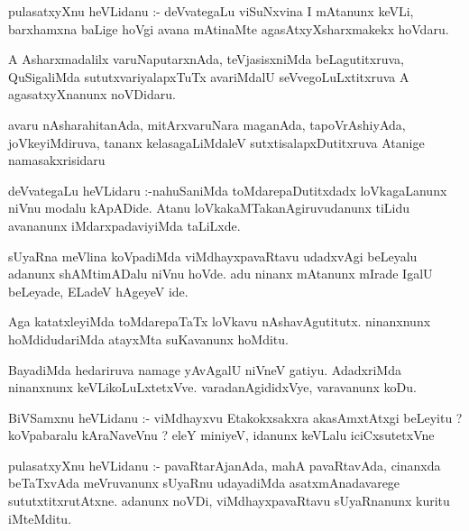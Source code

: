 \documentclass{article}
\begin{document}
\begin{mn}
pulasatxyXnu  heVLidanu :- deVvategaLu  viSuNxvina  I  mAtanunx  keVLi,  barxhamxna  
baLige  hoVgi  avana  mAtinaMte  agasAtxyXsharxmakekx  hoVdaru.
\end{mn}

\begin{mn}
A Asharxmadalilx  varuNaputarxnAda,  teVjasisxniMda  beLagutitxruva,  QuSigaliMda  
sututxvariyalapxTuTx  avariMdalU  seVvegoLuLxtitxruva  A  agasatxyXnanunx  noVDidaru.
\end{mn}

\begin{mn}
avaru  nAsharahitanAda,  mitArxvaruNara  maganAda,  tapoVrAshiyAda,  joVkeyiMdiruva,  
tananx  kelasagaLiMdaleV  sutxtisalapxDutitxruva  Atanige  namasakxrisidaru
\end{mn}

\begin{mn}
deVvategaLu  heVLidaru :-nahuSaniMda  toMdarepaDutitxdadx  loVkagaLanunx  niVnu  modalu  
kApADide.  Atanu  loVkakaMTakanAgiruvudanunx  tiLidu  avananunx  iMdarxpadaviyiMda  taLiLxde.
\end{mn}

\begin{mn}
sUyaRna  meVlina  koVpadiMda  viMdhayxpavaRtavu  udadxvAgi  beLeyalu  adanunx  shAMtimADalu  
niVnu  hoVde.  adu  ninanx  mAtanunx  mIrade  IgalU  beLeyade,  ELadeV  hAgeyeV  ide.
\end{mn}

\begin{mn}
Aga  katatxleyiMda  toMdarepaTaTx  loVkavu  nAshavAgutitutx.  ninanxnunx  hoMdidudariMda  
atayxMta  suKavanunx  hoMditu.
\end{mn}

\begin{mn}
BayadiMda  hedariruva  namage  yAvAgalU  niVneV  gatiyu.  AdadxriMda  ninanxnunx  
keVLikoLuLxtetxVve.  varadanAgididxVye,  varavanunx  koDu.
\end{mn}

\begin{mn}
BiVSamxnu  heVLidanu :- viMdhayxvu  Etakokxsakxra  akasAmxtAtxgi  beLeyitu ?  koVpabaralu  
kAraNaveVnu ?  eleY  miniyeV,  idanunx   keVLalu  iciCxsutetxVne
\end{mn}

\begin{mn}
pulasatxyXnu  heVLidanu :- pavaRtarAjanAda,  mahA pavaRtavAda,  cinanxda  beTaTxvAda  
meVruvanunx  sUyaRnu  udayadiMda  asatxmAnadavarege  sututxtitxrutAtxne.  adanunx  
noVDi,  viMdhayxpavaRtavu  sUyaRnanunx  kuritu  iMteMditu.
\end{mn}
\end{document}
